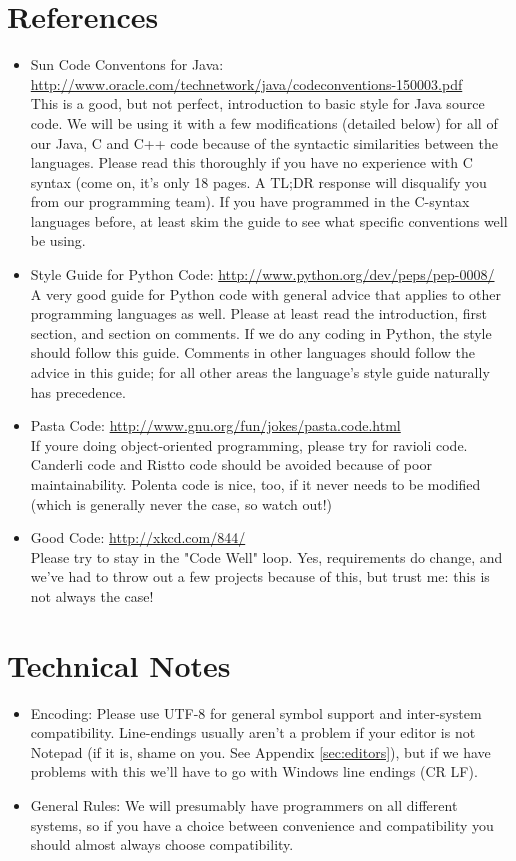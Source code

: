 \documentclass{article}
\begin{document}
\section{References}
\label{sec:references}
\begin{itemize}
    \item Sun Code Conventons for Java: \url{http://www.oracle.com/technetwork/java/codeconventions-150003.pdf} \\
        This is a good, but not perfect, introduction to basic style for Java source code. We will be using it with a few modifications (detailed below) for all of our Java, C and C++ code because of the syntactic similarities between the languages. Please read this thoroughly if you have no experience with C syntax (come on, it's only 18 pages. A TL;DR response will disqualify you from our programming team). If you have programmed in the C-syntax languages before, at least skim the guide to see what specific conventions well be using.
    \item \label{pyguide} Style Guide for Python Code: \url{http://www.python.org/dev/peps/pep-0008/} \\
        A very good guide for Python code with general advice that applies to other programming languages as well. Please at least read the introduction, first section, and section on comments. If we do any coding in Python, the style should follow this guide. Comments in other languages should follow the advice in this guide; for all other areas the language's style guide naturally has precedence.
    \item Pasta Code: \url{http://www.gnu.org/fun/jokes/pasta.code.html} \\
        If youre doing object-oriented programming, please try for ravioli code. Canderli code and Ristto code should be avoided because of poor maintainability. Polenta code is nice, too, if it never needs to be modified (which is generally never the case, so watch out!)
    \item Good Code: \url{http://xkcd.com/844/} \\
        Please try to stay in the "Code Well" loop. Yes, requirements do change, and we've had to throw out a few projects because of this, but trust me: this is not always the case!
\end{itemize}

\section{Technical Notes}
\begin{itemize}
\item Encoding: Please use UTF-8 for general symbol support and inter-system compatibility. Line-endings usually aren't a problem if your editor is not Notepad (if it is, shame on you. See Appendix \ref{sec:editors}), but if we have problems with this we'll have to go with Windows line endings (CR LF).
    \item General Rules: We will presumably have programmers on all different systems, so if you have a choice between convenience and compatibility you should almost always choose compatibility.

\end{itemize}
\end{document}
